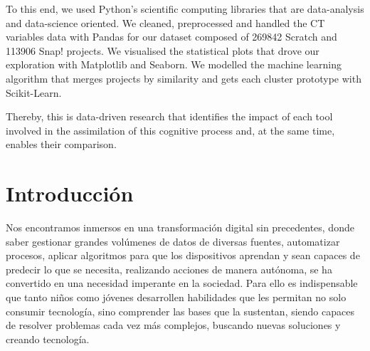 \documentclass[a4paper, 12pt]{book}
\begin{document}
To this end, we used Python's scientific computing libraries that are data-analysis and data-science oriented. We cleaned, preprocessed and handled the CT variables data with Pandas for our dataset composed of 269842 Scratch and 113906 Snap! projects. We visualised the statistical plots that drove our exploration with Matplotlib and Seaborn.
We modelled the machine learning algorithm that merges projects by similarity and gets each cluster prototype with Scikit-Learn.

Thereby, this is data-driven research that identifies the impact of each tool involved in the assimilation
of this cognitive process and, at the same time, enables their comparison.




\tableofcontents 
\cleardoublepage
\listoffigures %
\cleardoublepage
\listoftables %



\cleardoublepage
\chapter{Introducción}
\label{chap:intro} %

Nos encontramos inmersos en una transformación digital sin precedentes, donde saber gestionar grandes volúmenes de datos de diversas fuentes, automatizar procesos, aplicar algoritmos para que los dispositivos aprendan y sean capaces de predecir lo que se necesita, realizando acciones de manera autónoma, se ha convertido en una necesidad imperante en la sociedad. Para ello es indispensable que tanto niños como jóvenes desarrollen habilidades que les permitan no solo consumir tecnología, sino comprender las bases que la sustentan, siendo capaces de resolver problemas cada vez más complejos, buscando nuevas soluciones y creando tecnología.
  
\end{document}
